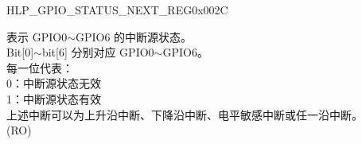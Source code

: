 \begin{register}{H}{LP\_GPIO\_STATUS\_NEXT\_REG}{0x002C}\label{regdesc:LPGPIOSTATUSNEXTREG}
%
%
\regnewline%
\begin{regdesc}\begin{reglist}
\label{fielddesc:LPGPIOSTATUSINTERRUPTNEXT}\item [LP\_GPIO\_STATUS\_INTERRUPT\_NEXT] 表示 GPIO0$\sim$GPIO6 的中断源状态。\\
Bit[0]$\sim$bit[6] 分别对应 GPIO0$\sim$GPIO6。\\
每一位代表：\\
0：中断源状态无效\\
1：中断源状态有效\\ 
上述中断可以为上升沿中断、下降沿中断、电平敏感中断或任一沿中断。\\ (RO)
\end{reglist}\end{regdesc}
\end{register}


